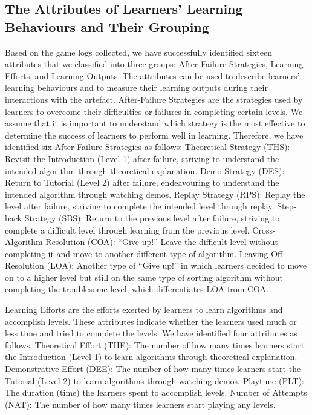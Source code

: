 \documentclass[conference]{IEEEtran}
\begin{document}
\subsection{The Attributes of Learners’ Learning Behaviours and Their Grouping}
\label{sec:attributes}

Based on the game logs collected, we have successfully identified sixteen attributes that we classified into three groups: After-Failure Strategies, Learning Efforts, and Learning Outputs. The attributes can be used to describe learners’ learning behaviours and to measure their learning outputs during their interactions with the artefact. After-Failure Strategies are the strategies used by learners to overcome their difficulties or failures in completing certain levels. We assume that it is important to understand which strategy is the most effective to determine the success of learners to perform well in learning. Therefore, we have identified six After-Failure Strategies as follows: Theoretical Strategy (THS): Revisit the Introduction (Level 1) after failure, striving to understand the intended algorithm through theoretical explanation. Demo Strategy (DES): Return to Tutorial (Level 2) after failure, endeavouring to understand the intended algorithm through watching demos. Replay Strategy (RPS): Replay the level after failure, striving to complete the intended level through replay. Step-back Strategy (SBS): Return to the previous level after failure, striving to complete a difficult level through learning from the previous level. Cross-Algorithm Resolution (COA): ``Give up!'' Leave the difficult level without completing it and move to another different type of algorithm. Leaving-Off Resolution (LOA): Another type of “Give up!” in which learners decided to move on to a higher level but still on the same type of sorting algorithm without completing the troublesome level, which differentiates LOA from COA.

Learning Efforts are the efforts exerted by learners to learn algorithms and accomplish levels. These attributes indicate whether the learners used much or less time and tried to complete the levels. We have identified four attributes as follows. Theoretical Effort (THE): The number of how many times learners start the Introduction (Level 1) to learn algorithms through theoretical explanation. Demonstrative Effort (DEE): The number of how many times learners start the Tutorial (Level 2) to learn algorithms through watching demos. Playtime (PLT): The duration (time) the learners spent to accomplish levels. Number of Attempts (NAT): The number of how many times learners start playing any levels.
\end{document}
